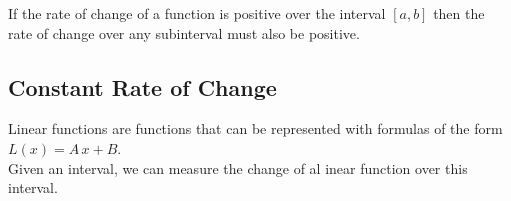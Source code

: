 \documentclass{ximera}
\begin{document}
\begin{question}
If the rate of change of a function is positive over the interval $[a,b]$ then the rate of change over any subinterval must also be positive.
    \begin{multipleChoice}
    \end{multipleChoice}
\end{question}



\subsection*{Constant Rate of Change}


Linear functions are functions that can be represented with formulas of the form $L(x) = A \, x + B$. \\


Given an interval, we can measure the change of al inear function over this interval. \\
\end{document}
